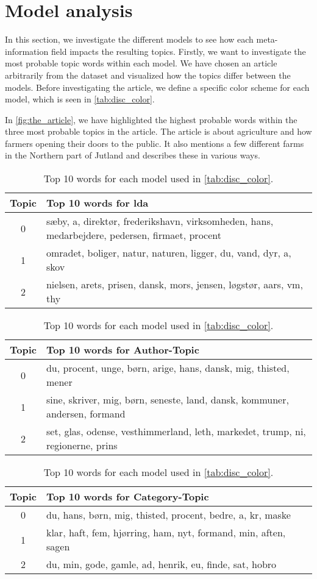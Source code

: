 \section{Model analysis}\label{sec:discussion}
In this section, we investigate the different models to see how each meta-information field impacts the resulting topics.
Firstly, we want to investigate the most probable topic words within each model.
We have chosen an article arbitrarily from the dataset and visualized how the topics differ between the models. 
Before investigating the article, we define a specific color scheme for each model, which is seen in \autoref{tab:disc_color}.

In \autoref{fig:the_article}, we have highlighted the highest probable words within the three most probable topics in the article.
The article is about agriculture and how farmers opening their doors to the public. 
It also mentions a few different farms in the Northern part of Jutland and describes these in various ways.

\begin{table}
	\caption{Top 10 words for each model used in \autoref{tab:disc_color}.}
	\label{tab:top_words_three_models}
	\begin{tabular}{c|p{}}
		Topic & Top 10 words for \gls{lda} \\
		\midrule
		0 & sæby, a, direktør, frederikshavn, virksomheden, hans, medarbejdere, pedersen, firmaet, procent \\
		1 & omradet, boliger, natur, naturen, ligger, du, vand, dyr, a, skov \\
		2 & nielsen, arets, prisen, dansk, mors, jensen, løgstør, aars, vm, thy \\
	\end{tabular}
	\begin{tabular}{c|p{}}
		\midrule
		Topic & Top 10 words for Author-Topic \\
		\midrule
		0 & du, procent, unge, børn, arige, hans, dansk, mig, thisted, mener\\
		1 & sine, skriver, mig, børn, seneste, land, dansk, kommuner, andersen, formand \\
		2 & set, glas, odense, vesthimmerland, leth, markedet, trump, ni, regionerne, prins\\
	\end{tabular}
	\begin{tabular}{c|p{}}
		\midrule
		Topic & Top 10 words for Category-Topic \\
		\midrule
		0 & du, hans, børn, mig, thisted, procent, bedre, a, kr, maske \\
		1 & klar, haft, fem, hjørring, ham, nyt, formand, min, aften, sagen\\
		2 & du, min, gode, gamle, ad, henrik, eu, finde, sat, hobro\\
	\end{tabular}
\end{table}

